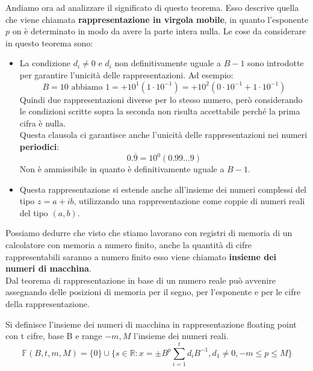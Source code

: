 \noindent Andiamo ora ad analizzare il significato di questo teorema. Esso descrive quella che viene chiamata \textbf{rappresentazione
in virgola mobile}, in quanto l'esponente \(p\) on è determinato in modo da avere la parte intera nulla. Le cose da considerare
in questo teorema sono:
\begin{itemize}
    \item La condizione \(d_i \neq 0\) e \(d_i\) non definitivamente uguale a \(B - 1\) sono introdotte per garantire
    l'unicità delle rappresentazioni. Ad esempio:
    \[B = 10 \text{ abbiamo } 1 = +10^1 (1 \cdot 10^{-1}) = +10^2 (0 \cdot 10^{-1} + 1 \cdot 10^{-1})\]
    Quindi due rappresentazioni diverse per lo stesso numero, però considerando le condizioni scritte sopra la seconda non risulta
    accettabile perché la prima cifra è nulla.\\
    Questa clausola ci garantisce anche l'unicità delle rappresentazioni nei numeri \textbf{periodici}:
    \begin{equation*}
    	0.\overline{9} = 10^0 (0.99\ldots9)
    \end{equation*}
    Non è ammissibile in quanto è definitivamente uguale a $B-1$.
    \item Questa rappresentazione si estende anche all'insieme dei numeri complessi del tipo \(z = a + ib\), utilizzando una rappresentazione
    come coppie di numeri reali del tipo \((a,b)\).
\end{itemize}

Possiamo dedurre che visto che stiamo lavorano con registri di memoria di un calcolatore con memoria a numero finito, anche la quantità
di cifre rappresentabili saranno a numero finito esso viene chiamato \textbf{insieme dei numeri di macchina}.\\

Dal teorema di rappresentazione in base di un numero reale può avvenire assegnando delle posizioni di memoria per il segno, 
per l'esponente e per le cifre della rappresentazione.

\begin{definition}
    Si definisce l'insieme dei numeri di macchina in rappresentazione floating point con t cifre, base B e range \(-m, M\) l'insieme dei numeri reali.
    \[\mathbb{F}(B, t, m, M) = \{0\} \cup \{s \in \mathbb{R} : x = \pm B^p \sum_{i=1}^{t} d_i B^{-1}, d_1 \neq 0, -m \leq p \leq M\}\]
\end{definition}

